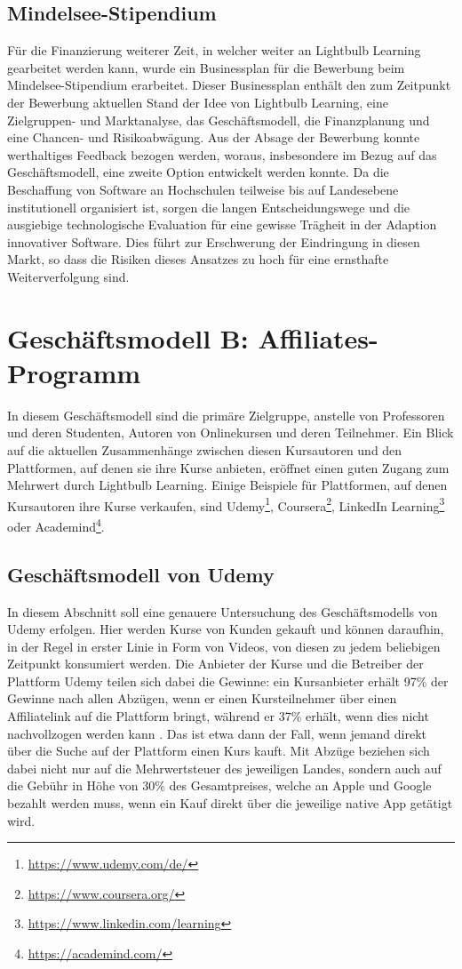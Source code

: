 \subsection{Mindelsee-Stipendium}
Für die Finanzierung weiterer Zeit, in welcher weiter an Lightbulb Learning gearbeitet werden kann, wurde ein Businessplan für die Bewerbung beim Mindelsee-Stipendium erarbeitet. Dieser Businessplan enthält den zum Zeitpunkt der Bewerbung aktuellen Stand der Idee von Lightbulb Learning, eine Zielgruppen- und Marktanalyse, das Geschäftsmodell, die Finanzplanung und eine Chancen- und Risikoabwägung. Aus der Absage der Bewerbung konnte werthaltiges Feedback bezogen werden, woraus, insbesondere im Bezug auf das Geschäftsmodell, eine zweite Option entwickelt werden konnte. Da die Beschaffung von Software an Hochschulen teilweise bis auf Landesebene institutionell organisiert ist, sorgen die langen Entscheidungswege und die ausgiebige technologische Evaluation für eine gewisse Trägheit in der Adaption innovativer Software. Dies führt zur Erschwerung der Eindringung in diesen Markt, so dass die Risiken dieses Ansatzes zu hoch für eine ernsthafte Weiterverfolgung sind.

\section{Geschäftsmodell B: Affiliates-Programm}
In diesem Geschäftsmodell sind die primäre Zielgruppe, anstelle von Professoren und deren Studenten, Autoren von Onlinekursen und deren Teilnehmer. Ein Blick auf die aktuellen Zusammenhänge zwischen diesen Kursautoren und den Plattformen, auf denen sie ihre Kurse anbieten, eröffnet einen guten Zugang zum Mehrwert durch Lightbulb Learning. Einige Beispiele für Plattformen, auf denen Kursautoren ihre Kurse verkaufen, sind Udemy\footnote{\url{https://www.udemy.com/de/}}, Coursera\footnote{\url{https://www.coursera.org/}}, LinkedIn Learning\footnote{\url{https://www.linkedin.com/learning}} oder Academind\footnote{\url{https://academind.com/}}.

\subsection{Geschäftsmodell von Udemy}

In diesem Abschnitt soll eine genauere Untersuchung des Geschäftsmodells von Udemy erfolgen. Hier werden Kurse von Kunden gekauft und können daraufhin, in der Regel in erster Linie in Form von Videos, von diesen zu jedem beliebigen Zeitpunkt konsumiert werden. Die Anbieter der Kurse und die Betreiber der Plattform Udemy teilen sich dabei die Gewinne: ein Kursanbieter erhält 97\% der Gewinne nach allen Abzügen, wenn er einen Kursteilnehmer über einen Affiliatelink auf die Plattform bringt, während er 37\% erhält, wenn dies nicht nachvollzogen werden kann \cite{Udemy2022}. Das ist etwa dann der Fall, wenn jemand direkt über die Suche auf der Plattform einen Kurs kauft. Mit Abzüge beziehen sich dabei nicht nur auf die Mehrwertsteuer des jeweiligen Landes, sondern auch auf die Gebühr in Höhe von 30\% des Gesamtpreises, welche an Apple und Google bezahlt werden muss, wenn ein Kauf direkt über die jeweilige native App getätigt wird.

